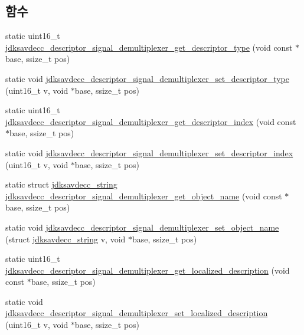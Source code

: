 \subsection*{함수}
\begin{DoxyCompactItemize}
\item 
static uint16\+\_\+t \hyperlink{group__descriptor__signal__demultiplexer_ga3533becd15730cfd744d851c05dcdd3b}{jdksavdecc\+\_\+descriptor\+\_\+signal\+\_\+demultiplexer\+\_\+get\+\_\+descriptor\+\_\+type} (void const $\ast$base, ssize\+\_\+t pos)
\item 
static void \hyperlink{group__descriptor__signal__demultiplexer_gaec58a550645eef272d4541a62570ed9f}{jdksavdecc\+\_\+descriptor\+\_\+signal\+\_\+demultiplexer\+\_\+set\+\_\+descriptor\+\_\+type} (uint16\+\_\+t v, void $\ast$base, ssize\+\_\+t pos)
\item 
static uint16\+\_\+t \hyperlink{group__descriptor__signal__demultiplexer_ga9cc7ad93d9b5c4a6938e3de30dd3af68}{jdksavdecc\+\_\+descriptor\+\_\+signal\+\_\+demultiplexer\+\_\+get\+\_\+descriptor\+\_\+index} (void const $\ast$base, ssize\+\_\+t pos)
\item 
static void \hyperlink{group__descriptor__signal__demultiplexer_gab930fff90c1625f1f4eee9370251f454}{jdksavdecc\+\_\+descriptor\+\_\+signal\+\_\+demultiplexer\+\_\+set\+\_\+descriptor\+\_\+index} (uint16\+\_\+t v, void $\ast$base, ssize\+\_\+t pos)
\item 
static struct \hyperlink{structjdksavdecc__string}{jdksavdecc\+\_\+string} \hyperlink{group__descriptor__signal__demultiplexer_ga3a72d4ee560220aec7e7eae679f9c01a}{jdksavdecc\+\_\+descriptor\+\_\+signal\+\_\+demultiplexer\+\_\+get\+\_\+object\+\_\+name} (void const $\ast$base, ssize\+\_\+t pos)
\item 
static void \hyperlink{group__descriptor__signal__demultiplexer_ga676992214d561b95303b013389ae86d4}{jdksavdecc\+\_\+descriptor\+\_\+signal\+\_\+demultiplexer\+\_\+set\+\_\+object\+\_\+name} (struct \hyperlink{structjdksavdecc__string}{jdksavdecc\+\_\+string} v, void $\ast$base, ssize\+\_\+t pos)
\item 
static uint16\+\_\+t \hyperlink{group__descriptor__signal__demultiplexer_ga235e35f6c688e3ad90a7504d4eca509c}{jdksavdecc\+\_\+descriptor\+\_\+signal\+\_\+demultiplexer\+\_\+get\+\_\+localized\+\_\+description} (void const $\ast$base, ssize\+\_\+t pos)
\item 
static void \hyperlink{group__descriptor__signal__demultiplexer_ga7c17fd30254b67bef7c447764b761c3c}{jdksavdecc\+\_\+descriptor\+\_\+signal\+\_\+demultiplexer\+\_\+set\+\_\+localized\+\_\+description} (uint16\+\_\+t v, void $\ast$base, ssize\+\_\+t pos)

\end{DoxyCompactItemize}
